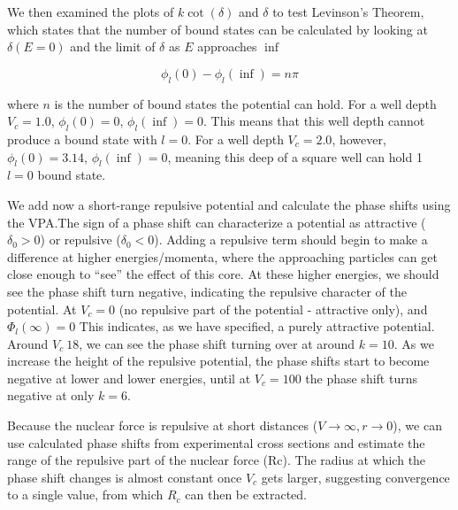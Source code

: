 \documentclass[10pt,showpacs,preprintnumbers,footinbib,amsmath,amssymb,aps,prl,twocolumn,groupedaddress,superscriptaddress,showkeys]{revtex4-1}
\begin{document}
We then examined the plots of $k\cot(\delta)$ and $\delta$ to test Levinson's Theorem,
which states that the number of bound states can be calculated by looking at $\delta(E=0)$
and the limit of $\delta$ as $E$ approaches $\inf$

\begin{equation*}
	\phi_l(0)-\phi_l(\inf)=n\pi
\end{equation*}

where $n$ is the number of bound states the potential can hold. For a well depth $V_c=1.0$,
$\phi_l(0)=0$,  $\phi_l(\inf)=0$. This means that this well depth cannot produce a bound state
with $l=0$. For a well depth $V_c=2.0$, however,  $\phi_l(0)=3.14$,  $\phi_l(\inf)=0$, meaning
this deep of a square  well can hold 1 $l=0$ bound state.

We add now a short-range repulsive potential and calculate the phase shifts using the VPA.The
sign of a phase shift can characterize a potential as attractive ($\delta_0>0$) or repulsive
($\delta_0<0$). Adding a repulsive term should begin to make a difference at higher
energies/momenta, where the approaching particles can get close enough to ``see'' the effect of
this core. At these higher energies, we should see the phase shift turn negative, indicating the
repulsive character of the potential. At $V_c=0$ (no repulsive part of the potential - attractive
only), and $\Phi_l(\infty)=0$ This indicates, as we have specified, a purely attractive potential.
Around $V_c~18$, we can see the phase shift turning over at around $k=10$. As we increase
the height of the repulsive potential, the phase shifts start to become negative at lower and
lower energies, until at $V_c=100$ the phase shift turns negative at only $k=6$. 

Because the nuclear force is repulsive at short distances ($V \rightarrow \infty, r \rightarrow 0$),
we can use calculated phase shifts from experimental cross sections and estimate the range
of the repulsive part of the nuclear force (Rc). The radius at which the phase shift changes is
almost constant once $V_c$ gets larger, suggesting convergence to a single value, from which
$R_c$ can then be extracted. 
\end{document}
